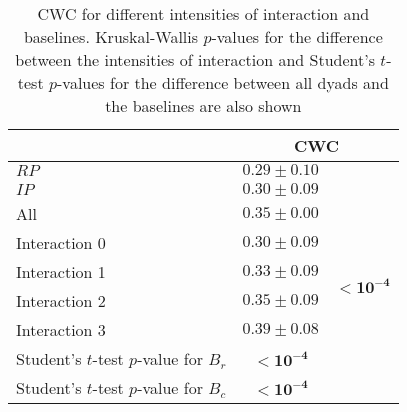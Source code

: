 \begin{table}
\centering
\caption{CWC for different intensities of interaction and baselines. Kruskal-Wallis $p$-values for the difference between the intensities of interaction and Student's $t$-test $p$-values for the difference between all dyads and the baselines are also shown\label{tab:coherence_interaction}}
\begin{tabular}{lcc}
\toprule
 & \multicolumn{2}{c}{CWC} \\
\midrule
$RP$ & $0.29 \pm 0.10$ & \\
$IP$ & $0.30 \pm 0.09$ & \\
\midrule
All & $0.35 \pm 0.00$ & \\
\midrule
Interaction 0 & $0.30 \pm 0.09$ & \multirow{4}{*}{$\mathbf{< 10^{-4}}$} \\
Interaction 1 & $0.33 \pm 0.09$ & \\
Interaction 2 & $0.35 \pm 0.09$ & \\
Interaction 3 & $0.39 \pm 0.08$ & \\
\midrule
Student's $t$-test $p$-value for $B_r$ & $\mathbf{< 10^{-4}}$  &\\
Student's $t$-test $p$-value for $B_c$ & $\mathbf{< 10^{-4}}$ &\\
\bottomrule
\end{tabular}
\end{table}
